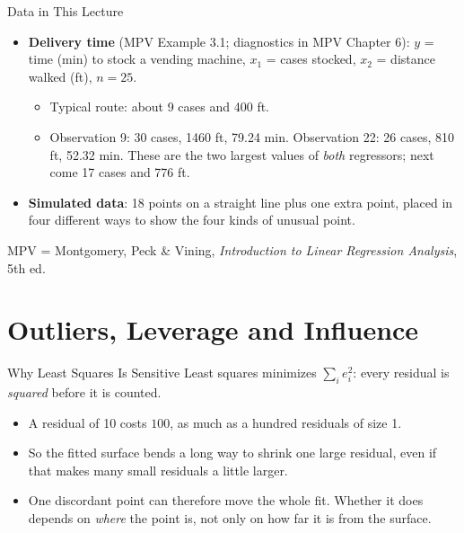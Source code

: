 \begin{frame}{Data in This Lecture}
    \begin{itemize}
        \item \textbf{Delivery time} (MPV Example 3.1; diagnostics in MPV Chapter 6): $y$ = time (min) to stock a vending machine, $x_1$ = cases stocked, $x_2$ = distance walked (ft), $n=25$.
        \begin{itemize}
            \item Typical route: about 9 cases and 400 ft.
            \item Observation 9: 30 cases, 1460 ft, 79.24 min. Observation 22: 26 cases, 810 ft, 52.32 min. These are the two largest values of \emph{both} regressors; next come 17 cases and 776 ft.
        \end{itemize}
        \item \textbf{Simulated data}: 18 points on a straight line plus one extra point, placed in four different ways to show the four kinds of unusual point.
    \end{itemize}
    \svspace{0.3em}
    MPV = Montgomery, Peck \& Vining, \emph{Introduction to Linear Regression Analysis}, 5th ed.
\end{frame}


\section{Outliers, Leverage and Influence}


\begin{frame}{Why Least Squares Is Sensitive}
    Least squares minimizes $\sum_i e_i^2$: every residual is \emph{squared} before it is counted.
    \svspace{0.5em}
    \begin{itemize}
        \item A residual of 10 costs $100$, as much as a hundred residuals of size 1.
        \item So the fitted surface bends a long way to shrink one large residual, even if that makes many small residuals a little larger.
        \item One discordant point can therefore move the whole fit. Whether it does depends on \emph{where} the point is, not only on how far it is from the surface.
    \end{itemize}
\end{frame}


